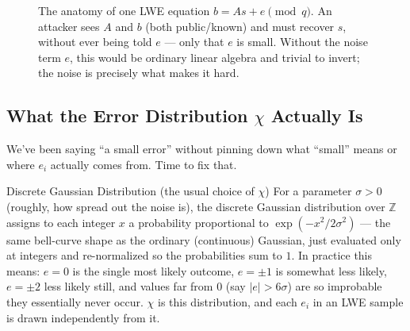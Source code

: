 \begin{figure}[ht]
\centering
{}
\caption{The anatomy of one LWE equation $b = As + e \pmod q$. An attacker sees $A$ and $b$ (both public/known) and must recover $s$, without ever being told $e$ --- only that $e$ is small. Without the noise term $e$, this would be ordinary linear algebra and trivial to invert; the noise is precisely what makes it hard.}
\label{fig:lwe-anatomy}
\end{figure}

\subsection{What the Error Distribution \texorpdfstring{$\chi$}{chi} Actually Is}
\label{sec:L2:what-the-error-distribution-actually-is}

We've been saying ``a small error'' without pinning down what ``small'' means or where $e_i$ actually comes from. Time to fix that.

\begin{defbox}{Discrete Gaussian Distribution (the usual choice of $\chi$)}
For a parameter $\sigma>0$ (roughly, how spread out the noise is), the discrete Gaussian distribution over $\mathbb{Z}$ assigns to each integer $x$ a probability proportional to $\exp(-x^2/2\sigma^2)$ --- the same bell-curve shape as the ordinary (continuous) Gaussian, just evaluated only at integers and re-normalized so the probabilities sum to $1$. In practice this means: $e=0$ is the single most likely outcome, $e=\pm 1$ is somewhat less likely, $e=\pm 2$ less likely still, and values far from $0$ (say $|e| > 6\sigma$) are so improbable they essentially never occur. $\chi$ is this distribution, and each $e_i$ in an LWE sample is drawn independently from it.
\end{defbox}

